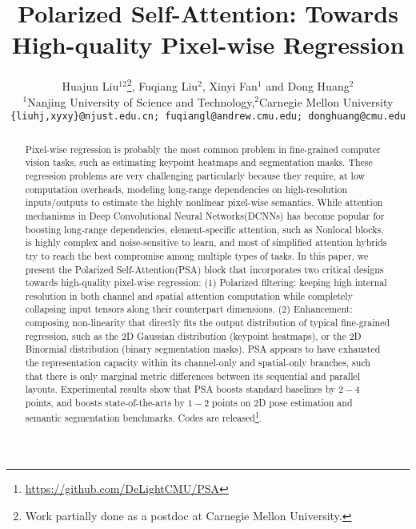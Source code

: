 \documentclass[10pt,twocolumn,letterpaper]{article}
\begin{document}
\title{Polarized Self-Attention: Towards High-quality Pixel-wise Regression}

\author{Huajun Liu$^{12}$\thanks{Work partially done as a postdoc at Carnegie Mellon University.}, Fuqiang Liu$^{2}$, Xinyi Fan$^{1}$ and Dong Huang$^{2}$\\
{\small $^{1}$Nanjing University of Science and Technology,$^{2}$Carnegie Mellon University}\\
{\tt\small  \{liuhj,xyxy\}@njust.edu.cn; fuqiangl@andrew.cmu.edu; donghuang@cmu.edu} 
}

\maketitle
\ificcvfinal\thispagestyle{empty}\fi

\begin{abstract}
 Pixel-wise regression is probably the most common problem in fine-grained computer vision tasks, such as estimating keypoint heatmaps and segmentation masks. These regression problems are very challenging particularly because they require, at low computation overheads, modeling long-range dependencies on high-resolution inputs/outputs to estimate the highly nonlinear pixel-wise semantics. While attention mechanisms in Deep Convolutional Neural Networks(DCNNs) has become popular for boosting long-range dependencies, element-specific attention, such as Nonlocal blocks, is highly complex and noise-sensitive to learn, and most of simplified attention hybrids try to reach the best compromise among multiple types of tasks. In this paper, we present the Polarized Self-Attention(PSA) block that incorporates two critical designs towards high-quality pixel-wise regression: (1) Polarized filtering: keeping high internal resolution in both channel and spatial attention computation while completely collapsing input tensors along their counterpart dimensions. (2) Enhancement: composing non-linearity that directly fits the output distribution of typical fine-grained regression, such as the 2D Gaussian distribution (keypoint heatmaps), or the 2D Binormial distribution (binary segmentation masks). PSA appears to have exhausted the representation capacity within its channel-only and spatial-only branches, such that there is only marginal metric differences between its sequential and parallel layouts. Experimental results show that PSA boosts standard baselines by $2-4$ points, and boosts state-of-the-arts by $1-2$ points on 2D pose estimation and semantic segmentation benchmarks. Codes are released\footnote{\url{https://github.com/DeLightCMU/PSA}}.
\end{abstract}
\end{document}
